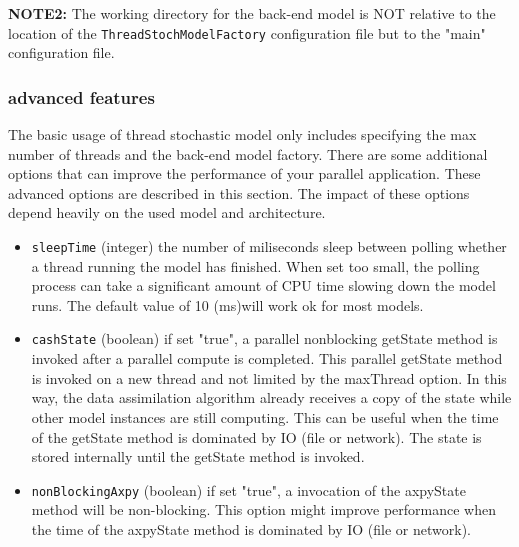 {\bf NOTE2:} The working directory for the back-end model is NOT relative to
the location of the {\tt ThreadStochModelFactory} configuration file but to the
"main" \oda configuration file.

\subsubsection{advanced features}
The basic usage of thread stochastic model only includes specifying the max
number of threads and the back-end model factory. There are some additional
options that can improve the performance of your parallel application. These
advanced options are described in this section. The impact of these options
depend heavily on the used model and architecture.
\begin{itemize}
\item {\tt sleepTime} (integer) the number of miliseconds sleep between polling whether a thread running the model has finished. When set too small, the polling process can take a significant amount of CPU time slowing down the model runs. The default value of 10 (ms)will work ok for most models. 
\item {\tt cashState} (boolean) if set "true", a parallel nonblocking getState
  method is invoked after a parallel compute is completed. This parallel
  getState method is invoked on a new thread and not limited by the maxThread
  option. In this way, the data assimilation algorithm already receives a copy
  of the state while other model instances are still computing. This can be
  useful when the time of the getState method is dominated by IO (file or
  network). The state is stored internally until the getState method is
  invoked.

\item{\tt nonBlockingAxpy} (boolean) if set "true", a invocation of the
  axpyState method will be non-blocking. This option might improve performance
  when the time of the axpyState method is dominated by IO (file or network).
\end{itemize}

